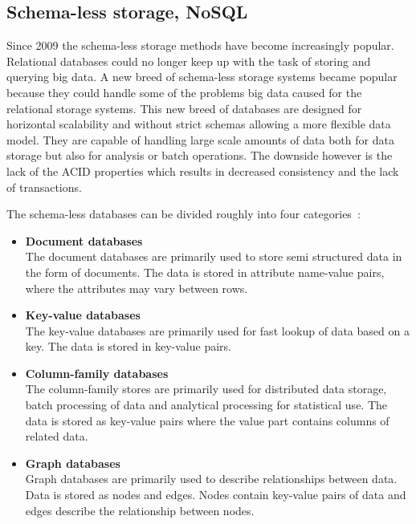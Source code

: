 \subsection{Schema-less storage, NoSQL}
\label{sec:nosql}
Since 2009 the schema-less storage methods have become increasingly popular.
Relational databases could no longer keep up with the task of storing and querying big data.
A new breed of schema-less storage systems became popular because they could handle some of the problems big data caused for the relational storage systems.
This new breed of databases are designed for horizontal scalability and without strict schemas allowing a more flexible data model. 
They are capable of handling large scale amounts of data both for data storage but also for analysis or batch operations.
The downside however is the lack of the ACID properties which results in decreased consistency and the lack of transactions. %

The schema-less databases can be divided roughly into four categories~\cite{Fowler:IntroNoSQL, Moniruzzaman:NoSQLDatabaseNewEraOfDatabasesForBigDataAnalysis}:

\begin{itemize}
	\item \textbf{Document databases} \\
	The document databases are primarily used to store semi structured data in the form of documents. The data is stored in attribute name-value pairs, where the attributes may vary between rows.
	
	\item \textbf{Key-value databases} \\
	The key-value databases are primarily used for fast lookup of data based on a key. The data is stored in key-value pairs.
	
	\item \textbf{Column-family databases} \\
	The column-family stores are primarily used for distributed data storage, batch processing of data and analytical processing for statistical use. The data is stored as key-value pairs where the value part contains columns of related data.
	
	\item \textbf{Graph databases} \\
	Graph databases are primarily used to describe relationships between data. Data is stored as nodes and edges. Nodes contain key-value pairs of data and edges describe the relationship between nodes.
\end{itemize}

